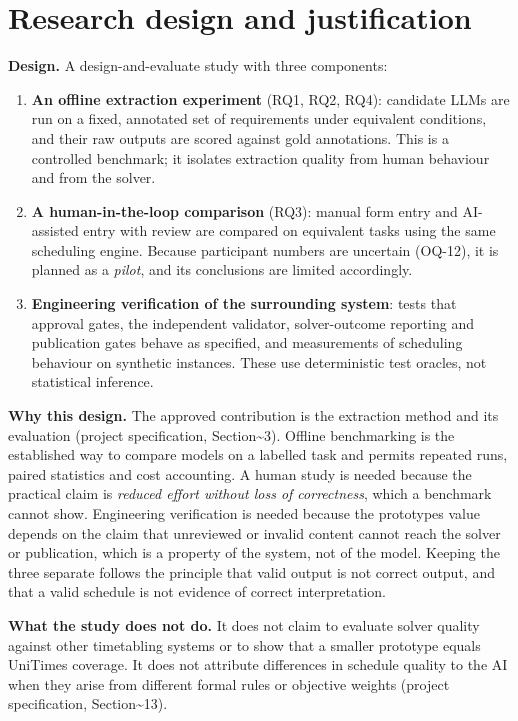 \documentclass[
  11pt,a4paper,oneside]{report}
\providecommand{\tightlist}{%
  \setlength{\itemsep}{0pt}\setlength{\parskip}{0pt}}
\begin{document}
\hypertarget{research-design-and-justification}{%
\section{Research design and
justification}\label{research-design-and-justification}}

\textbf{Design.} A design-and-evaluate study with three components:

\begin{enumerate}
\def\labelenumi{\arabic{enumi}.}
\tightlist
\item
  \textbf{An offline extraction experiment} (RQ1, RQ2, RQ4): candidate
  LLMs are run on a fixed, annotated set of requirements under
  equivalent conditions, and their raw outputs are scored against gold
  annotations. This is a controlled benchmark; it isolates extraction
  quality from human behaviour and from the solver.
\item
  \textbf{A human-in-the-loop comparison} (RQ3): manual form entry and
  AI-assisted entry with review are compared on equivalent tasks using
  the same scheduling engine. Because participant numbers are uncertain
  (OQ-12), it is planned as a \emph{pilot}, and its conclusions are
  limited accordingly.
\item
  \textbf{Engineering verification of the surrounding system}: tests
  that approval gates, the independent validator, solver-outcome
  reporting and publication gates behave as specified, and measurements
  of scheduling behaviour on synthetic instances. These use
  deterministic test oracles, not statistical inference.
\end{enumerate}

\textbf{Why this design.} The approved contribution is the extraction
method and its evaluation (project specification,
Section\textasciitilde3). Offline benchmarking is the established way to
compare models on a labelled task and permits repeated runs, paired
statistics and cost accounting. A human study is needed because the
practical claim is \emph{reduced effort without loss of correctness},
which a benchmark cannot show. Engineering verification is needed
because the prototype\textquotesingle s value depends on the claim that
unreviewed or invalid content cannot reach the solver or publication,
which is a property of the system, not of the model. Keeping the three
separate follows the principle that valid output is not correct output,
and that a valid schedule is not evidence of correct interpretation.

\textbf{What the study does not do.} It does not claim to evaluate
solver quality against other timetabling systems or to show that a
smaller prototype equals UniTime\textquotesingle s coverage. It does not
attribute differences in schedule quality to the AI when they arise from
different formal rules or objective weights (project specification,
Section\textasciitilde13).
\end{document}
